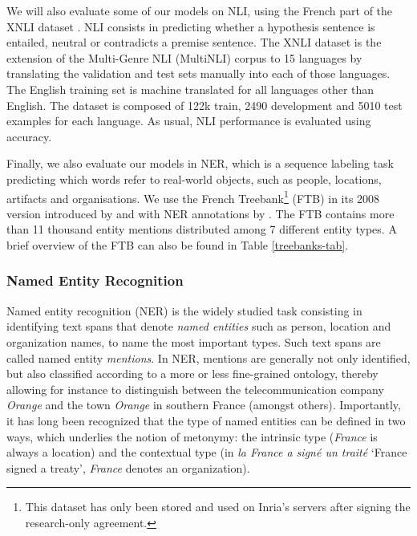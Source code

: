 We will also evaluate some of our models on NLI, using the French part of the XNLI dataset \citep{conneau-etal-2018-xnli}. NLI consists in predicting whether a hypothesis sentence is entailed, neutral or contradicts a premise sentence. The XNLI dataset is the extension of the Multi-Genre NLI (MultiNLI) corpus \citep{williams-etal-2018-broad} to 15 languages by translating the validation and test sets manually into each of those languages.
The English training set is machine translated for all languages other than English.
The dataset is composed of 122k train, 2490 development and 5010 test examples for each language. As usual, NLI performance is evaluated using accuracy.

Finally, we also evaluate our models in NER, which is a sequence labeling task predicting which words refer to real-world objects, such as people, locations, artifacts and organisations. We use the French Treebank\footnote{This dataset has only been stored and used on Inria's servers after signing the research-only agreement.} (FTB) \citep{abeille-etal-2003-building} in its 2008 version introduced by \citet{candito-crabbe-2009-improving} and with NER annotations by \citet{sagot-etal-2012-annotation}. The FTB contains more than 11 thousand entity mentions distributed among 7 different entity types. A brief overview of the FTB can also be found in Table \ref{treebanks-tab}.

\subsubsection{Named Entity Recognition}

Named entity recognition (NER) is the widely studied task consisting in identifying text spans that denote \emph{named entities} such as person, location and organization names, to name the most important types. Such text spans are called named entity \emph{mentions}. In NER, mentions are generally not only identified, but also classified according to a more or less fine-grained ontology, thereby allowing for instance to distinguish between the telecommunication company \emph{Orange} and the town \emph{Orange} in southern France (amongst others). Importantly, it has long been recognized that the type of named entities can be defined in two ways, which underlies the notion of metonymy: the intrinsic type (\emph{France} is always a location) and the contextual type (in \emph{la France a signé un traité} `France signed a treaty', \emph{France} denotes an organization).

